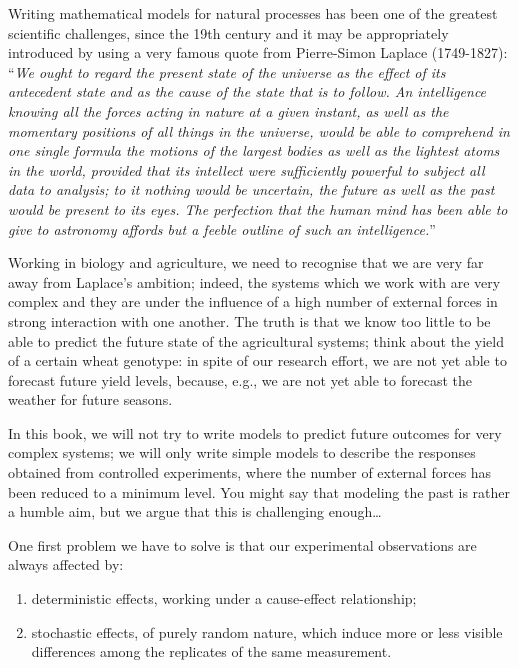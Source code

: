 \documentclass[a4paper,12pt,oneside]{book}
\providecommand{\tightlist}{%
  \setlength{\itemsep}{0pt}\setlength{\parskip}{0pt}}
\begin{document}
Writing mathematical models for natural processes has been one of the greatest scientific challenges, since the 19th century and it may be appropriately introduced by using a very famous quote from Pierre-Simon Laplace (1749-1827): ``\emph{We ought to regard the present state of the universe as the effect of its antecedent state and as the cause of the state that is to follow. An intelligence knowing all the forces acting in nature at a given instant, as well as the momentary positions of all things in the universe, would be able to comprehend in one single formula the motions of the largest bodies as well as the lightest atoms in the world, provided that its intellect were sufficiently powerful to subject all data to analysis; to it nothing would be uncertain, the future as well as the past would be present to its eyes. The perfection that the human mind has been able to give to astronomy affords but a feeble outline of such an intelligence.}''

Working in biology and agriculture, we need to recognise that we are very far away from Laplace's ambition; indeed, the systems which we work with are very complex and they are under the influence of a high number of external forces in strong interaction with one another. The truth is that we know too little to be able to predict the future state of the agricultural systems; think about the yield of a certain wheat genotype: in spite of our research effort, we are not yet able to forecast future yield levels, because, e.g., we are not yet able to forecast the weather for future seasons.

In this book, we will not try to write models to predict future outcomes for very complex systems; we will only write simple models to describe the responses obtained from controlled experiments, where the number of external forces has been reduced to a minimum level. You might say that modeling the past is rather a humble aim, but we argue that this is challenging enough\ldots{}

One first problem we have to solve is that our experimental observations are always affected by:

\begin{enumerate}
\def\labelenumi{\arabic{enumi}.}
\tightlist
\item
  deterministic effects, working under a cause-effect relationship;
\item
  stochastic effects, of purely random nature, which induce more or less visible differences among the replicates of the same measurement.
\end{enumerate}
\end{document}
